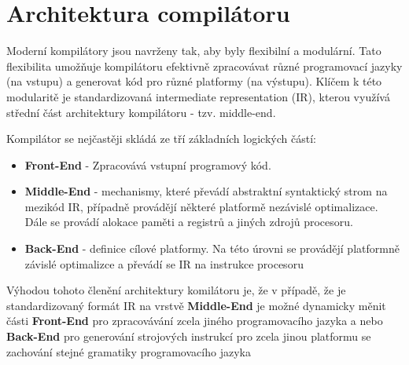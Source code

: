 
\section {Architektura compilátoru}
Moderní kompilátory jsou navrženy tak, aby byly flexibilní a modulární. Tato flexibilita umožňuje kompilátoru efektivně zpracovávat různé programovací jazyky (na vstupu) a generovat kód pro různé platformy (na výstupu). Klíčem k této modularitě je standardizovaná intermediate representation (IR), kterou využívá střední část architektury kompilátoru - tzv. middle-end. 

Kompilátor se nejčastěji skládá ze tří základních logických částí:
\begin{itemize}
    \item \textbf{Front-End} - Zpracovává vstupní programový kód.
    \item \textbf{Middle-End} - mechanismy, které převádí abstraktní syntaktický strom na mezikód IR, případně provádějí některé platformě nezávislé optimalizace. Dále se provádí alokace paměti a registrů a jiných zdrojů procesoru. 
    \item \textbf{Back-End} - definice cílové platformy. Na této úrovni se provádějí platformně závislé optimalizce a převádí se IR na instrukce procesoru
\end{itemize}


Výhodou tohoto členění architektury komilátoru je, že v případě, že je standardizovaný formát IR na vrstvě \textbf{Middle-End} je možné dynamicky měnit části \textbf{Front-End} pro zpracovávání zcela jiného programovacího jazyka a nebo \textbf{Back-End} pro generování strojových instrukcí pro zcela jinou platformu se zachování stejné gramatiky programovacího jazyka
